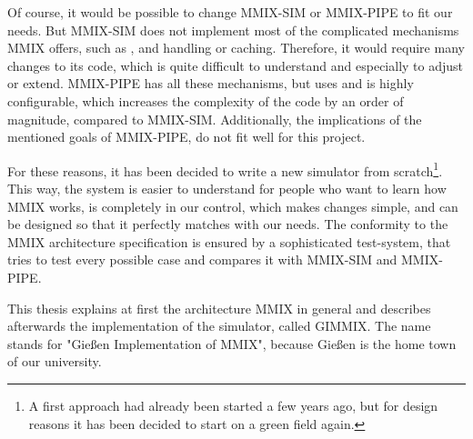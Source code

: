 Of course, it would be possible to change MMIX-SIM or MMIX-PIPE to fit our needs. But MMIX-SIM does not implement most of the complicated mechanisms MMIX offers, such as ,  and  handling or caching. Therefore, it would require many changes to its code, which is quite difficult to understand and especially to adjust or extend. MMIX-PIPE has all these mechanisms, but uses  and is highly configurable, which increases the complexity of the code by an order of magnitude, compared to MMIX-SIM. Additionally, the implications of the mentioned goals of MMIX-PIPE, do not fit well for this project.

For these reasons, it has been decided to write a new simulator from scratch\footnote{A first approach had already been started a few years ago, but for design reasons it has been decided to start on a green field again.}. This way, the system is easier to understand for people who want to learn how MMIX works, is completely in our control, which makes changes simple, and can be designed so that it perfectly matches with our needs. The conformity to the MMIX architecture specification is ensured by a sophisticated test-system, that tries to test every possible case and compares it with MMIX-SIM and MMIX-PIPE.

\medskip

This thesis explains at first the architecture MMIX in general and describes afterwards the implementation of the simulator, called GIMMIX. The name stands for "Gießen Implementation of MMIX", because Gießen is the home town of our university.

